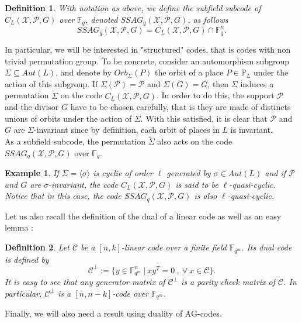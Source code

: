 \documentclass[10pt]{article}
\newtheorem{def1}{Definition}[]
\newtheorem{expl}{Example}[]
\newcommand{\s}{\vspace{0.3cm}}
\newcommand{\fqm}{\mathbb{F}_{q^m}}
\newcommand{\fq}{\mathbb{F}_q}
\newcommand{\su}{\subseteq}
\newcommand{\X}{\mathcal{X}}
\newcommand{\PR}{\mathcal{P}}
\begin{document}
\s

\begin{def1}
With notation as above, we define the subfield subcode of $C_L(\X,\PR,G)$ over $\fq$, denoted $SSAG_q(\X,\PR,G)$, as follows
\[ SSAG_q(\X,\PR,G) = C_L(\X,\PR,G) \cap \fq^n.\]
\end{def1}

\s

In particular, we will be interested in "structured" codes, that is codes with non trivial permutation group. To be concrete, consider an automorphism subgroup $\Sigma \su Aut(L)$, and denote by $Orb_{\Sigma}(P)$ the orbit of a place $P \in \mathbb{P}_L$ under the action of this subgroup. If $\Sigma(\PR) = \PR$ and $\Sigma(G)=G$, then $\Sigma$ induces a permutation $\tilde{\Sigma}$ on the code $C_L(\X,\PR,G)$. In order to do this, the support $\PR$ and the divisor $G$ have to be chosen carefully, that is they are made of distincts unions of orbits under the action of $\Sigma$. With this satisfied, it is clear that $\PR$ and $G$ are $\Sigma$-invariant since by definition, each orbit of places in $L$ is invariant. \\
As a subfield subcode, the permutation $\tilde{\Sigma}$ also acts on the code $SSAG_q(\X,\PR,G)$ over $\fq$.

\s

\begin{expl} 
\rm If $\Sigma = \langle\sigma\rangle$ is cyclic of order $\ell$ generated by $\sigma \in Aut(L)$ and if $\PR$ and $G$ are $\sigma$-invariant, the code $C_L(\X,\PR,G)$ is said to be $\ell$-quasi-cyclic. Notice that in this case, the code $SSAG_q(\X,\PR,G)$ is also $\ell$-quasi-cyclic.
\end{expl}

\s

Let us also recall the definition of the dual of a linear code as well as an easy lemma :

\s

\begin{def1}
Let $\mathcal{C}$ be a $[n,k]$-linear code over a finite field $\fqm$. Its dual code is defined by 
\[\mathcal{C}^{\perp} := \{ y \in \fqm^n \ | \ xy^T = 0 \ , \ \forall \ x \in \mathcal{C}\}.\]
It is easy to see that any generator matrix of $\mathcal{C}^{\perp}$ is a parity check matrix of $\mathcal{C}$. In particular, $\mathcal{C}^{\perp}$ is a $[n,n-k]$-code over $\fqm$.
\end{def1}

\s

Finally, we will also need a result using duality of AG-codes.
\end{document}

